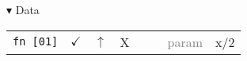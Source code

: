 \documentclass[dvisvgm]{standalone}
\begin{document}
\begin{tcolorbox}
$\blacktriangledown$ Data


\begin{tabular}{c*{5}{|p{1em}}|p{5em}|p{5em}|}
    \texttt{fn [01]} & \hfil $\checkmark$ \hfil & \hfil $\uparrow$ \hfil & \hfil X \hfil & & &\textcolor{gray}{param} & x/2 \\
\end{tabular}
\end{tcolorbox}
\end{document}
